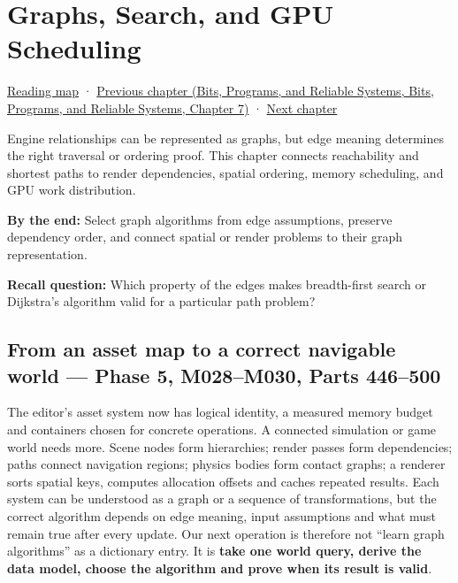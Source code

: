 \hypertarget{01-foundations-i-ch008}{}
\chapter{Graphs, Search, and GPU Scheduling}\label{stagechapter:01-foundations-i-ch008}\label{01-foundations-i-ch008-graphs-search-and-gpu-scheduling}

\hyperref[volume-reading-map]{Reading map} · \href{../01-Bits-Programs-and-Reliable-Systems/main.pdf\#nameddest=01-foundations-i-ch007-typed-interfaces-identity-and-data-structures}{Previous chapter (Bits, Programs, and Reliable Systems, Bits, Programs, and Reliable Systems, Chapter 7)} · \hyperref[01-foundations-i-ch009-gpu-memory-divergence-atomics-and-ordering]{Next chapter}

Engine relationships can be represented as graphs, but edge meaning determines the right traversal or ordering proof. This chapter connects reachability and shortest paths to render dependencies, spatial ordering, memory scheduling, and GPU work distribution.

\textbf{By the end:} Select graph algorithms from edge assumptions, preserve dependency order, and connect spatial or render problems to their graph representation.

\textbf{Recall question:} Which property of the edges makes breadth-first search or Dijkstra's algorithm valid for a particular path problem?

\section{From an asset map to a correct navigable world --- Phase 5, M028--M030, Parts 446--500}\label{01-foundations-i-ch008-from-an-asset-map-to-a-correct-navigable-world-phase-5-m028m030-parts-446500}

The editor's asset system now has logical identity, a measured memory budget and containers chosen for concrete operations. A connected simulation or game world needs more. Scene nodes form hierarchies; render passes form dependencies; paths connect navigation regions; physics bodies form contact graphs; a renderer sorts spatial keys, computes allocation offsets and caches repeated results. Each system can be understood as a graph or a sequence of transformations, but the correct algorithm depends on edge meaning, input assumptions and what must remain true after every update. Our next operation is therefore not ``learn graph algorithms'' as a dictionary entry. It is \textbf{take one world query, derive the data model, choose the algorithm and prove when its result is valid}.

